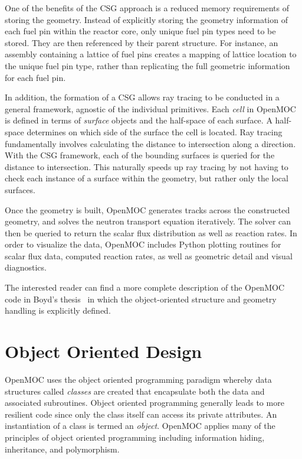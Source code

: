 One of the benefits of the \ac{CSG} approach is a reduced memory requirements of storing the geometry. Instead of explicitly storing the geometry information of each fuel pin within the reactor core, only unique fuel pin types need to be stored. They are then referenced by their parent structure. For instance, an assembly containing a lattice of fuel pins creates a mapping of lattice location to the unique fuel pin type, rather than replicating the full geometric information for each fuel pin.

In addition, the formation of a \ac{CSG} allows ray tracing to be conducted in a general framework, agnostic of the individual primitives. Each \textit{cell} in OpenMOC is defined in terms of \textit{surface} objects and the half-space of each surface. A half-space determines on which side of the surface the cell is located. Ray tracing fundamentally involves calculating the distance to intersection along a direction. With the \ac{CSG} framework, each of the bounding surfaces is queried for the distance to intersection. This naturally speeds up ray tracing by not having to check each instance of a surface within the geometry, but rather only the local surfaces. 

Once the geometry is built, OpenMOC generates tracks across the constructed geometry, and solves the neutron transport equation iteratively. The solver can then be queried to return the scalar flux distribution as well as reaction rates. In order to visualize the data, OpenMOC includes Python plotting routines for scalar flux data, computed reaction rates, as well as geometric detail and visual diagnostics. 

The interested reader can find a more complete description of the OpenMOC code in Boyd's thesis~\cite{boyd2014openmoc} in which the object-oriented structure and geometry handling is explicitly defined.


\section{Object Oriented Design}
\label{sec:object-oriented}

OpenMOC uses the object oriented programming paradigm whereby data structures called \textit{classes} are created that encapsulate both the data and associated subroutines. Object oriented programming generally leads to more resilient code since only the class itself can access its private attributes. An instantiation of a class is termed an \textit{object}. OpenMOC applies many of the principles of object oriented programming including information hiding, inheritance, and polymorphism.

